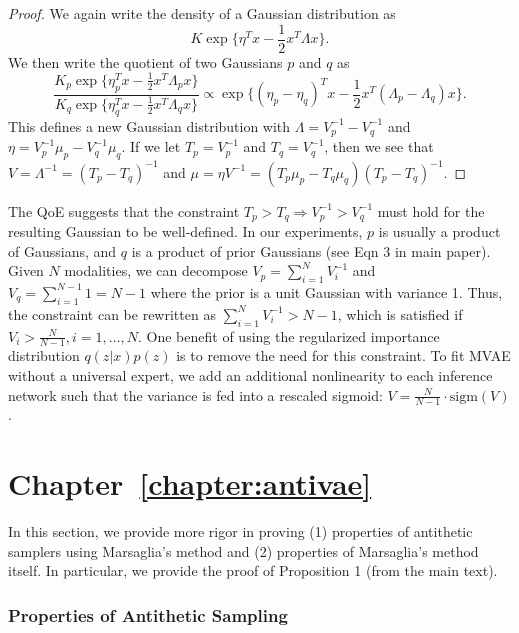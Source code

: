 \begin{proof} We again write the density of a Gaussian distribution as \[K \exp\{\eta^{T}x - \frac{1}{2}x^{T}\Lambda x\}.\] We then write the quotient of two Gaussians $p$ and $q$ as \[\frac{K_p\exp\{\eta^{T}_{p}x - \frac{1}{2}x^{T}\Lambda_{p}x\}}{K_q\exp\{\eta^{T}_{q}x - \frac{1}{2}x^{T}\Lambda_{q}x\}} \propto \exp\{(\eta_{p} - \eta_{q})^{T}x - \frac{1}{2}x^{T}(\Lambda_{p} - \Lambda_q)x\}.\] This defines a new Gaussian distribution with $\Lambda = V_{p}^{-1} - V_{q}^{-1}$ and $\eta = V_{p}^{-1}\mu_{p} - V_{q}^{-1}\mu_{q}$. If we let $T_p = V_{p}^{-1}$ and $T_q = V_{q}^{-1}$, then we see that $V = \Lambda^{-1} = (T_p - T_q)^{-1}$ and $\mu = \eta V^{-1} = (T_p\mu_p - T_q\mu_q)(T_p - T_q)^{-1}$.
\end{proof}

The QoE suggests that the constraint $T_p > T_q \Rightarrow V_{p}^{-1} > V_{q}^{-1}$ must hold for the resulting Gaussian to be well-defined. In our experiments, $p$ is usually a product of Gaussians, and $q$ is a product of prior Gaussians (see Eqn 3 in main paper). Given $N$ modalities, we can decompose $V_p = \sum_{i=1}^{N} V_{i}^{-1}$ and $V_q = \sum_{i=1}^{N - 1} 1 = N-1$ where the prior is a unit Gaussian with variance 1. Thus, the constraint can be rewritten as $\sum_{i=1}^{N} V_{i}^{-1} > N - 1$, which is satisfied if $V_{i} > \frac{N}{N-1}, i=1, ..., N$. One benefit of using the regularized importance distribution $q(z|x)p(z)$ is to remove the need for this constraint. To fit MVAE without a universal expert, we add an additional nonlinearity to each inference network such that the variance is fed into a rescaled sigmoid: $V = \frac{N}{N-1} \cdot \text{sigm}(V)$.

\section{Chapter~\ref{chapter:antivae}}
\label{sec:proof:anti}

In this section, we provide more rigor in proving (1) properties of antithetic samplers using Marsaglia's method and (2) properties of Marsaglia's method itself. In particular, we provide the proof of Proposition 1 (from the main text).

\subsubsection{Properties of Antithetic Sampling}

